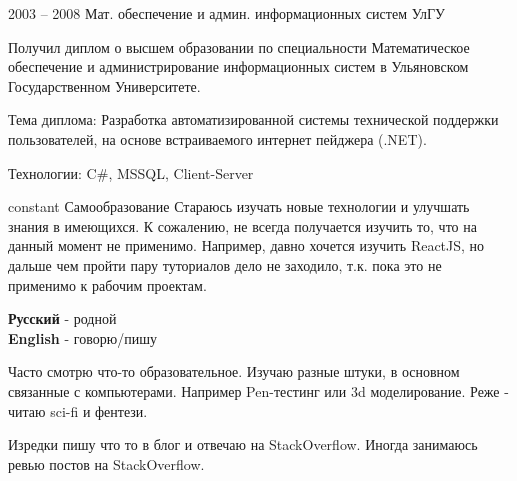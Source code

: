 \documentclass[10pt]{tpl/developercv} %
\begin{document}
\begin{entrylist}
	\entry
		{2003 -- 2008}
		{Мат. обеспечение и админ. информационных систем}
		{УлГУ}
		{Получил диплом о высшем образовании по специальности Математическое обеспечение и администрирование информационных систем в Ульяновском Государственном Университете.

		Тема диплома: Разработка автоматизированной системы технической поддержки пользователей, на основе встраиваемого интернет пейджера (.NET).

		Технологии: C\#, MSSQL, Client-Server
		}
	\entry
		{constant}
		{Самообразование}
		{}
		{Стараюсь изучать новые технологии и улучшать знания в имеющихся. К сожалению, не всегда получается изучить то, что на данный момент не применимо. Например, давно хочется изучить ReactJS, но дальше чем пройти пару туториалов дело не заходило, т.к. пока это не применимо к рабочим проектам.}
\end{entrylist}


\begin{minipage}[t]{0.3\textwidth}
	\vspace{-\baselineskip} %


	\textbf{Русский} - родной\\
	\textbf{English} - говорю/пишу\\
\end{minipage}
\hfill
\begin{minipage}[t]{0.3\textwidth}
	\vspace{-\baselineskip} %


	Часто смотрю что-то образовательное. Изучаю разные штуки, в основном связанные с компьютерами. Например Pen-тестинг или 3d моделирование.
	Реже - читаю sci-fi и фентези.
\end{minipage}
\hfill
\begin{minipage}[t]{0.3\textwidth}
	\vspace{-\baselineskip} %


	Изредки пишу что то в блог и отвечаю на StackOverflow. Иногда занимаюсь ревью постов на StackOverflow.
\end{minipage}
\end{document}
